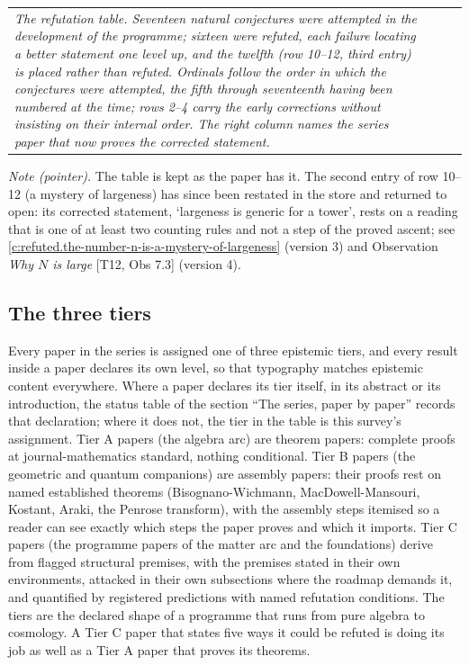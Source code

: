 \documentclass[11pt]{article}
\theoremstyle{definition}
\theoremstyle{plain}
\begin{document}
\begin{longtable}{p{} p{} p{} p{}}
\emph{The refutation table. Seventeen natural conjectures were attempted in the development of the programme; sixteen were refuted, each failure locating a better statement one level up, and the twelfth (row 10--12, third entry) is placed rather than refuted. Ordinals follow the order in which the conjectures were attempted, the fifth through seventeenth having been numbered at the time; rows 2--4 carry the early corrections without insisting on their internal order. The right column names the series paper that now proves the corrected statement.}

\end{longtable}

\emph{Note (pointer).} The table is kept as the paper has it. The second entry of row 10--12 (a mystery of largeness) has since been restated in the store and returned to open: its corrected statement, `largeness is generic for a tower', rests on a reading that is one of at least two counting rules and not a step of the proved ascent; see \ref{c:refuted.the-number-n-is-a-mystery-of-largeness} (version 3) and Observation \emph{Why $N$ is large} [T12, Obs 7.3] (version 4).

\subsection*{The three tiers}
\label{c:note.programme.setting-three-tiers}
Every paper in the series is assigned one of three epistemic tiers, and every result inside a paper declares its own level, so that typography matches epistemic content everywhere. Where a paper declares its tier itself, in its abstract or its introduction, the status table of the section ``The series, paper by paper'' records that declaration; where it does not, the tier in the table is this survey's assignment. Tier A papers (the algebra arc) are theorem papers: complete proofs at journal-mathematics standard, nothing conditional. Tier B papers (the geometric and quantum companions) are assembly papers: their proofs rest on named established theorems (Bisognano-Wichmann, MacDowell-Mansouri, Kostant, Araki, the Penrose transform), with the assembly steps itemised so a reader can see exactly which steps the paper proves and which it imports. Tier C papers (the programme papers of the matter arc and the foundations) derive from flagged structural premises, with the premises stated in their own environments, attacked in their own subsections where the roadmap demands it, and quantified by registered predictions with named refutation conditions. The tiers are the declared shape of a programme that runs from pure algebra to cosmology. A Tier C paper that states five ways it could be refuted is doing its job as well as a Tier A paper that proves its theorems.
\end{document}
